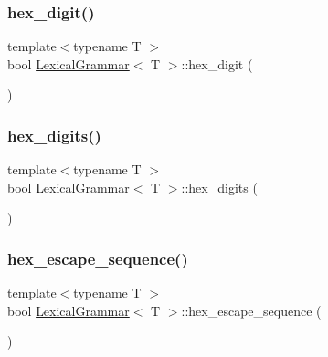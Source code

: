 \mbox{\label{class_lexical_grammar_afa260bdb5dc9224215a68ba07cce3a4a}} 
\subsubsection{\texorpdfstring{hex\+\_\+digit()}{hex\_digit()}}
{\footnotesize\ttfamily template$<$typename T $>$ \\
bool \hyperlink{class_lexical_grammar}{Lexical\+Grammar}$<$ T $>$\+::hex\+\_\+digit (\begin{DoxyParamCaption}{ }\end{DoxyParamCaption})\hspace{0.3cm}{\ttfamily [inline]}}

\mbox{\label{class_lexical_grammar_aeace42ff820851c2d59b3d0582cb2e5d}} 
\subsubsection{\texorpdfstring{hex\+\_\+digits()}{hex\_digits()}}
{\footnotesize\ttfamily template$<$typename T $>$ \\
bool \hyperlink{class_lexical_grammar}{Lexical\+Grammar}$<$ T $>$\+::hex\+\_\+digits (\begin{DoxyParamCaption}{ }\end{DoxyParamCaption})\hspace{0.3cm}{\ttfamily [inline]}}

\mbox{\label{class_lexical_grammar_a76722915a4ae4e864ffd7c750da8c9aa}} 
\subsubsection{\texorpdfstring{hex\+\_\+escape\+\_\+sequence()}{hex\_escape\_sequence()}}
{\footnotesize\ttfamily template$<$typename T $>$ \\
bool \hyperlink{class_lexical_grammar}{Lexical\+Grammar}$<$ T $>$\+::hex\+\_\+escape\+\_\+sequence (\begin{DoxyParamCaption}{ }\end{DoxyParamCaption})\hspace{0.3cm}{\ttfamily [inline]}}

